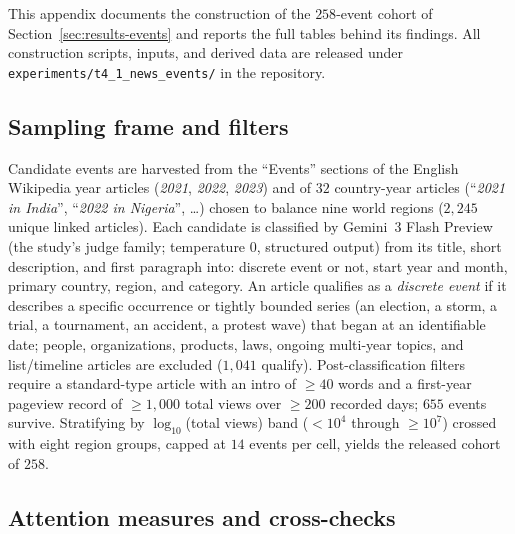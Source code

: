 This appendix documents the construction of the $258$-event cohort of Section~\ref{sec:results-events} and reports the full tables behind its findings. All construction scripts, inputs, and derived data are released under \texttt{experiments/t4\_1\_news\_events/} in the repository.

\subsection{Sampling frame and filters}

Candidate events are harvested from the ``Events'' sections of the English Wikipedia year articles (\emph{2021}, \emph{2022}, \emph{2023}) and of $32$ country-year articles (``\emph{2021 in India}'', ``\emph{2022 in Nigeria}'', \ldots) chosen to balance nine world regions ($2{,}245$ unique linked articles). Each candidate is classified by Gemini~3 Flash Preview (the study's judge family; temperature $0$, structured output) from its title, short description, and first paragraph into: discrete event or not, start year and month, primary country, region, and category. An article qualifies as a \emph{discrete event} if it describes a specific occurrence or tightly bounded series (an election, a storm, a trial, a tournament, an accident, a protest wave) that began at an identifiable date; people, organizations, products, laws, ongoing multi-year topics, and list/timeline articles are excluded ($1{,}041$ qualify). Post-classification filters require a standard-type article with an intro of $\geq 40$ words and a first-year pageview record of $\geq 1{,}000$ total views over $\geq 200$ recorded days; $655$ events survive. Stratifying by $\log_{10}$(total views) band ($<10^4$ through $\geq 10^7$) crossed with eight region groups, capped at $14$ events per cell, yields the released cohort of $258$.

\subsection{Attention measures and cross-checks}

